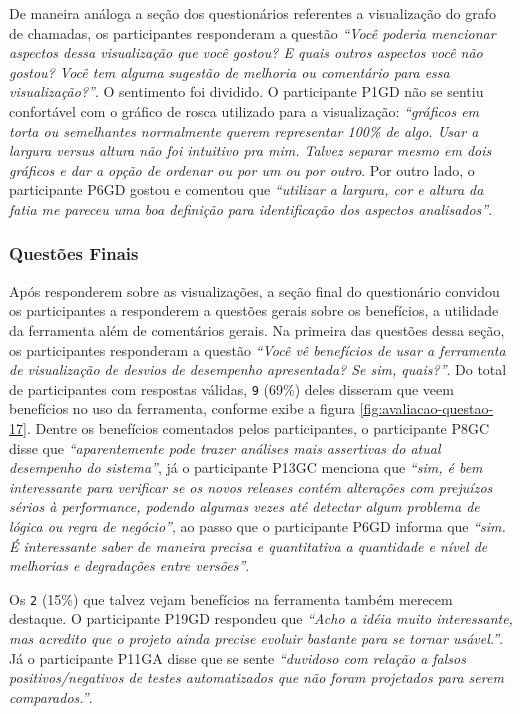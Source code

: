 De maneira análoga a seção dos questionários referentes a visualização do grafo de chamadas, os participantes responderam a questão \textit{``Você poderia mencionar aspectos dessa visualização que você gostou? E quais outros aspectos você não gostou? Você tem alguma sugestão de melhoria ou comentário para essa visualização?''}. O sentimento foi dividido. O participante P1GD não se sentiu confortável com o gráfico de rosca utilizado para a visualização: \textit{``gráficos em torta ou semelhantes normalmente querem representar 100\% de algo. Usar a largura versus altura não foi intuitivo pra mim. Talvez separar mesmo em dois gráficos e dar a opção de ordenar ou por um ou por outro}. Por outro lado, o participante P6GD gostou e comentou que \textit{``utilizar a largura, cor e altura da fatia me pareceu uma boa definição para identificação dos aspectos analisados''}.

\subsubsection{Questões Finais}

Após responderem sobre as visualizações, a seção final do questionário convidou os participantes a responderem a questões gerais sobre os benefícios, a utilidade da ferramenta além de comentários gerais. Na primeira das questões dessa seção, os participantes responderam a questão \textit{``Você vê benefícios de usar a ferramenta de visualização de desvios de desempenho apresentada? Se sim, quais?''}. Do total de participantes com respostas válidas, \texttt{9} (69\%) deles disseram que veem benefícios no uso da ferramenta, conforme exibe a figura \ref{fig:avaliacao-questao-17}. Dentre os benefícios comentados pelos participantes, o participante P8GC disse que \textit{``aparentemente pode trazer análises mais assertivas do atual desempenho do sistema''}, já o participante P13GC menciona que \textit{``sim, é bem interessante para verificar se os novos releases contém alterações com prejuízos sérios à performance, podendo algumas vezes até detectar algum problema de lógica ou regra de negócio''}, ao passo que o participante P6GD informa que \textit{``sim. É interessante saber de maneira precisa e quantitativa a quantidade e nível de melhorias e degradações entre versões''}.

Os \texttt{2} (15\%) que talvez vejam benefícios na ferramenta também merecem destaque. O participante P19GD respondeu que \textit{``Acho a idéia muito interessante, mas acredito que o projeto ainda precise evoluir bastante para se tornar usável.''}. Já o participante P11GA disse que se sente \textit{``duvidoso com relação a falsos positivos/negativos de testes automatizados que não foram projetados para serem comparados.''}.

